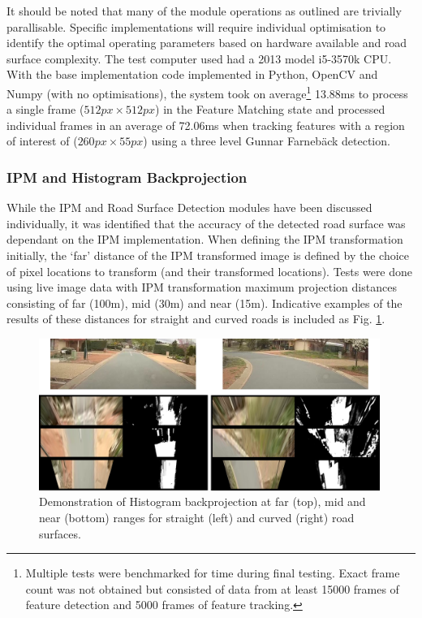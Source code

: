 \documentclass[]{aiaa-tc}%
\begin{document}
It should be noted that many of the module operations as outlined are trivially parallisable. Specific implementations will require individual optimisation to identify the optimal operating parameters based on hardware available and road surface complexity. The test computer used had a 2013 model i5-3570k CPU. With the base implementation code implemented in Python, OpenCV and Numpy (with no optimisations), the system took on average\footnote{Multiple tests were benchmarked for time during final testing. Exact frame count was not obtained but consisted of data from at least 15000 frames of feature detection and 5000 frames of feature tracking.} 13.88ms to process a single frame ($512px \times 512px$) in the Feature Matching state and processed individual frames in an average of 72.06ms when tracking features with a region of interest of ($260px \times 55px$) using a three level Gunnar Farneb{\"a}ck detection.

\subsubsection{IPM and Histogram Backprojection}

While the IPM and Road Surface Detection modules have been discussed individually, it was identified that the accuracy of the detected road surface was dependant on the IPM implementation. When defining the IPM transformation initially, the `far' distance of the IPM transformed image is defined by the choice of pixel locations to transform (and their transformed locations). Tests were done using live image data with IPM transformation maximum projection distances consisting of far (100m), mid (30m) and near (15m). Indicative examples of the results of these distances for straight and curved roads is included as Fig. \ref{f:ipmHistogramResults}.


\begin{figure}{}
	\centering
	\includegraphics[width=0.99\textwidth]{Results/ipmHistogramResults.png}
	\caption{Demonstration of Histogram backprojection at far (top), mid and near (bottom) ranges for straight (left) and curved (right) road surfaces.}
	\label{f:ipmHistogramResults}
\end{figure}
\end{document}
